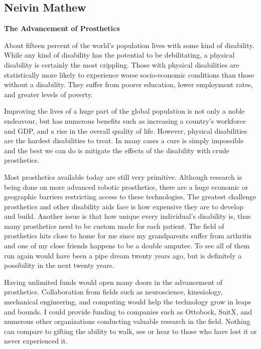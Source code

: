 \documentclass[12pt,letterpaper]{article}
\begin{document}
\subsection{Neivin Mathew}
\textbf{The Advancement of Prosthetics}\par
About fifteen percent of the world's population lives with some kind of disability. While any kind of disability has the potential to be debilitating, a physical disability is certainly the most crippling. Those with physical disabilities are statistically more likely to experience worse socio-economic conditions than those without a disability. They suffer from poorer education, lower employment rates, and greater levels of poverty.\par
Improving the lives of a huge part of the global population is not only a noble endeavour, but has numerous benefits such as increasing a country's workforce and GDP, and a rise in the overall quality of life. However, physical disabilities are the hardest disabilities to treat. In many cases a cure is simply impossible and the best we can do is mitigate the effects of the disability with crude prosthetics.\par
Most prosthetics available today are still very primitive. Although research is being done on more advanced robotic prosthetics, there are a huge economic or geographic barriers restricting access to these technologies. The greatest challenge prosthetics and other disability aids face is how expensive they are to develop and build. Another issue is that how unique every individual's disability is, thus many prosthetics need to be custom made for each patient. The field of prosthetics hits close to home for me since my grandparents suffer from arthritis and one of my close friends happens to be a double amputee. To see all of them run again would have been a pipe dream twenty years ago, but is definitely a possibility in the next twenty years. \par
Having unlimited funds would open many doors in the advancement of prosthetics. Collaboration from fields such as neuroscience, kinesiology, mechanical engineering, and computing would help the technology grow in leaps and bounds. I could provide funding to companies such as Ottobock, SuitX, and numerous other organizations conducting valuable research in the field. Nothing can compare to gifting the ability to walk, see or hear to those who have lost it or never experienced it.

\clearpage
\end{document}
